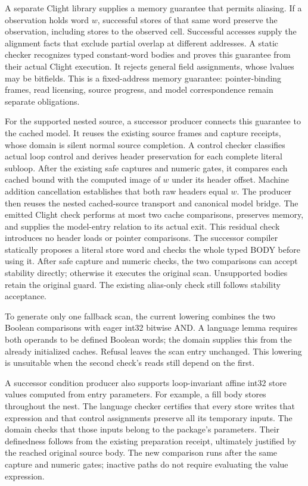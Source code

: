 A separate Clight library supplies a memory guarantee that permits aliasing.
If a  observation holds word $w$, successful  stores
of that same word preserve the observation, including stores to the observed
cell. Successful accesses supply the alignment facts that exclude partial
overlap at different addresses. A static checker recognizes typed constant-word
bodies and proves this guarantee from their actual Clight execution. It rejects
general field assignments, whose lvalues may be bitfields. This is a fixed-address
memory guarantee: pointer-binding frames, read licensing, source progress, and
model correspondence remain separate obligations.

For the supported nested source, a successor producer connects this guarantee
to the cached model. It reuses the existing source frames and capture receipts,
whose domain is silent normal source completion. A control checker classifies
actual loop control and derives header preservation for each
complete literal subloop. After the existing safe captures and numeric gates,
it compares each cached bound with the computed image of $w$ under its header
offset. Machine addition cancellation establishes that both raw headers equal
$w$. The producer then reuses the nested cached-source transport and canonical
model bridge. The emitted Clight check performs at most two cache comparisons,
preserves memory, and supplies the model-entry relation to its actual exit.
This residual check introduces no header loads or pointer comparisons.
The successor compiler statically proposes a literal store word and checks
the whole typed BODY before using it. After safe capture and numeric checks,
the two comparisons can accept stability directly; otherwise it executes the
original scan. Unsupported bodies retain the original guard. The existing
alias-only check still follows stability acceptance.

To generate only one fallback scan, the current lowering combines the two
Boolean comparisons with eager int32 bitwise AND. A language lemma requires
both operands to be defined Boolean words; the domain supplies this from the
already initialized caches. Refusal leaves the scan entry unchanged. This
lowering is unsuitable when the second check's reads still depend on the first.

A successor condition producer also supports loop-invariant affine int32
store values computed from entry parameters. For example, a fill body stores
 throughout the nest. The language checker certifies that
every store writes that expression and that control assignments preserve all
its temporary inputs. The domain checks that those inputs belong to the
package's parameters. Their definedness follows from the existing preparation
receipt, ultimately justified by the reached original source body. The new
comparison runs after the same capture and numeric gates; inactive paths do
not require evaluating the value expression.

